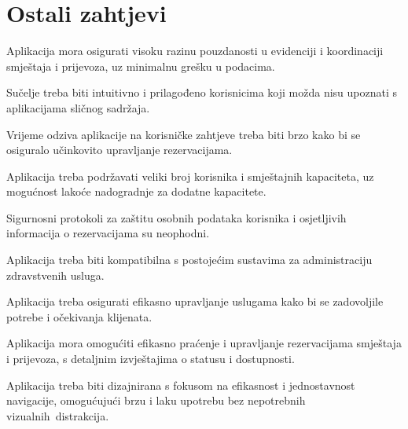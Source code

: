 				
				\eject
	
		\section{Ostali zahtjevi}
		
			\begin{packed_item}
				\setlength\itemsep{10pt}
				\item Aplikacija mora osigurati visoku razinu pouzdanosti u evidenciji i koordinaciji smještaja i prijevoza, uz minimalnu grešku u podacima.
				\item Sučelje treba biti intuitivno i prilagođeno korisnicima koji možda nisu upoznati s aplikacijama sličnog sadržaja.
				\item Vrijeme odziva aplikacije na korisničke zahtjeve treba biti brzo kako bi se osiguralo učinkovito upravljanje rezervacijama.
				\item Aplikacija treba podržavati veliki broj korisnika i smještajnih kapaciteta, uz mogućnost lakoće nadogradnje za dodatne kapacitete.
				\item Sigurnosni protokoli za zaštitu osobnih podataka korisnika i osjetljivih informacija o rezervacijama su neophodni.
				\item Aplikacija treba biti kompatibilna s postojećim sustavima za administraciju zdravstvenih usluga.
				\item Aplikacija treba osigurati efikasno upravljanje uslugama kako bi se zadovoljile potrebe i očekivanja klijenata.
				\item Aplikacija mora omogućiti efikasno praćenje i upravljanje rezervacijama smještaja i prijevoza, s detaljnim izvještajima o statusu i dostupnosti.
				\item Aplikacija treba biti dizajnirana s fokusom na efikasnost i jednostavnost navigacije, omogućujući brzu i laku upotrebu bez nepotrebnih vizualnih distrakcija.
			\end{packed_item}
			 
			 
			 
	
